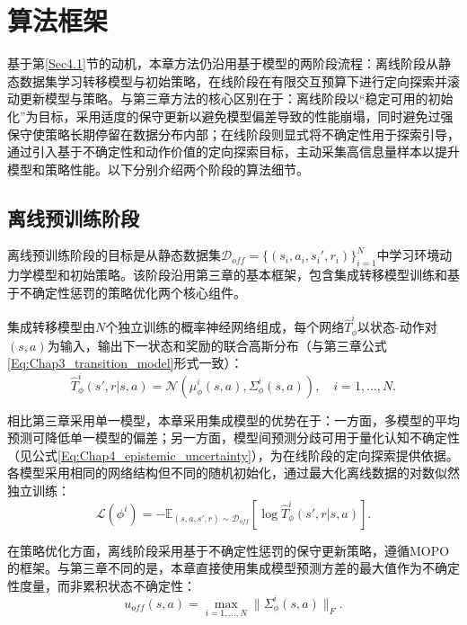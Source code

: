 \section{算法框架}\label{Sec4.2}
基于第\ref{Sec4.1}节的动机，本章方法仍沿用基于模型的两阶段流程：离线阶段从静态数据集学习转移模型与初始策略，在线阶段在有限交互预算下进行定向探索并滚动更新模型与策略。与第三章方法的核心区别在于：离线阶段以“稳定可用的初始化”为目标，采用适度的保守更新以避免模型偏差导致的性能崩塌，同时避免过强保守使策略长期停留在数据分布内部；在线阶段则显式将不确定性用于探索引导，通过引入基于不确定性和动作价值的定向探索目标，主动采集高信息量样本以提升模型和策略性能。以下分别介绍两个阶段的算法细节。

\subsection{离线预训练阶段}\label{Sec4.2.1}

离线预训练阶段的目标是从静态数据集$\mathcal{D}_{off} = \{(s_i, a_i, s_i', r_i)\}_{i=1}^N$中学习环境动力学模型和初始策略。该阶段沿用第三章的基本框架，包含集成转移模型训练和基于不确定性惩罚的策略优化两个核心组件。

集成转移模型由$N$个独立训练的概率神经网络组成，每个网络$\hat{T}_\phi^i$以状态-动作对$(s,a)$为输入，输出下一状态和奖励的联合高斯分布（与第三章公式\ref{Eq:Chap3_transition_model}形式一致）：
\begin{equation}\label{Eq:Chap4_ensemble_model}
  \hat{T}_\phi^i(s', r|s, a) = \mathcal{N}(\mu_\phi^i(s, a), \Sigma_\phi^i(s, a)), \quad i = 1, \ldots, N.
\end{equation}

相比第三章采用单一模型，本章采用集成模型的优势在于：一方面，多模型的平均预测可降低单一模型的偏差；另一方面，模型间预测分歧可用于量化认知不确定性（见公式\ref{Eq:Chap4_epistemic_uncertainty}），为在线阶段的定向探索提供依据。各模型采用相同的网络结构但不同的随机初始化，通过最大化离线数据的对数似然独立训练：
\begin{equation}\label{Eq:Chap4_model_training}
  \mathcal{L}(\phi^i) = -\mathbb{E}_{(s,a,s',r) \sim \mathcal{D}_{off}}[\log \hat{T}_\phi^i(s', r|s, a)].
\end{equation}

在策略优化方面，离线阶段采用基于不确定性惩罚的保守更新策略，遵循MOPO\cite{Yu2020MOPO}的框架。与第三章不同的是，本章直接使用集成模型预测方差的最大值作为不确定性度量，而非累积状态不确定性：
\begin{equation}\label{Eq:Chap4_offline_uncertainty}
  u_{off}(s, a) = \max_{i=1,\ldots,N} \|\Sigma_\phi^i(s, a)\|_F.
\end{equation}

